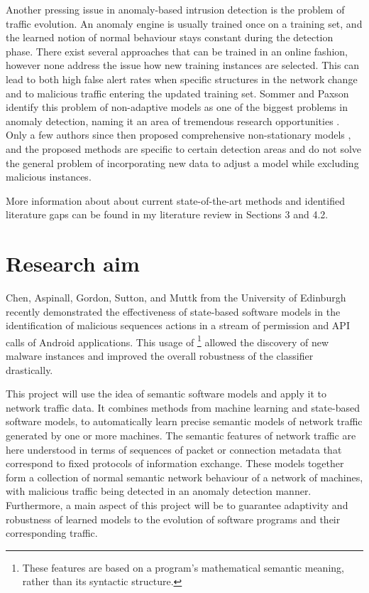 \documentclass[a4paper,12pt,twoside]{report}
\begin{document}
Another pressing issue in anomaly-based intrusion detection is the problem of traffic evolution. An anomaly engine is usually trained once on a training set, and the learned notion of normal behaviour stays constant during the detection phase. There exist several approaches that can be trained in an online fashion, however none address the issue how new training instances are selected. This can lead to both high false alert rates when specific structures in the network change and to malicious traffic entering the updated training set. Sommer and Paxson identify this problem of non-adaptive models as one of the biggest problems in anomaly detection, naming it an area of tremendous research opportunities \cite{sommer_outside_2010}. Only a few authors since then proposed comprehensive non-stationary models \cite{noble_real-time_2018,bodenham_adaptive_2014,wuchner2015robust}, and the proposed methods are specific to certain detection areas and do not solve the general problem of incorporating new data to adjust a model while excluding malicious instances.

More information about about current state-of-the-art methods and identified literature gaps can be found in my literature review in Sections 3 and 4.2.

\section{Research aim}

Chen, Aspinall, Gordon, Sutton, and Muttk \cite{chen_2016_robust,chen_more_2016} from the University of Edinburgh recently demonstrated the effectiveness of state-based software models in the identification of malicious sequences actions in a stream of permission and API calls of Android applications. This usage of \footnote{These features are based on a program's mathematical semantic meaning, rather than its syntactic structure.} allowed the discovery of new malware instances and improved the overall robustness of the classifier drastically. 

This project will use the idea of semantic software models and apply it to network traffic data. It combines methods from machine learning and state-based software models, to automatically learn precise semantic models of network traffic generated by one or more machines. The semantic features of network traffic are here understood in terms of sequences of packet or connection metadata that correspond to fixed protocols of information exchange. These models together form a collection of normal semantic network behaviour of a network of machines, with malicious traffic being detected in an anomaly detection manner. Furthermore, a main aspect of this project will be to guarantee adaptivity and robustness of learned models to the evolution of software programs and their corresponding traffic. 
\end{document}
